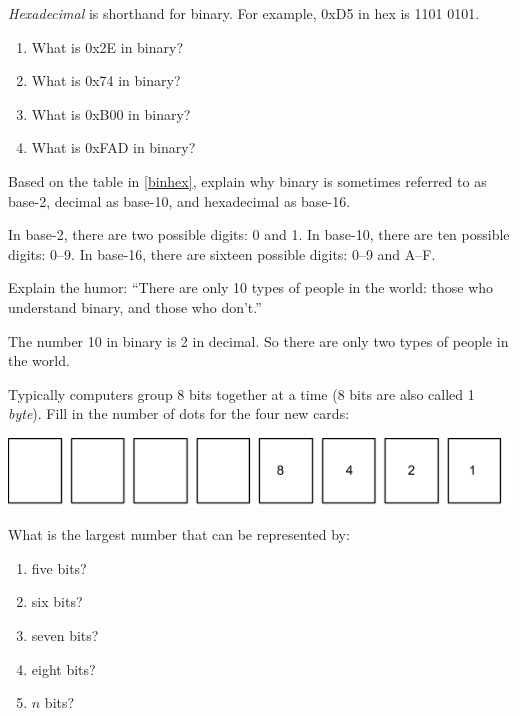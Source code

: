 \Q \emph{Hexadecimal} is shorthand for binary. For example, 0xD5 in hex is 1101 0101.

\begin{enumerate}
\item What is 0x2E in binary? 
\item What is 0x74 in binary? 
\item What is 0xB00 in binary? 
\item What is 0xFAD in binary? 
\end{enumerate}


\Q Based on the table in \ref{binhex}, explain why binary is sometimes referred to as base-2, decimal as base-10, and hexadecimal as base-16.

\begin{answer}
In base-2, there are two possible digits: 0 and 1.
In base-10, there are ten possible digits: 0--9.
In base-16, there are sixteen possible digits: 0--9 and A--F.
\end{answer}


\Q Explain the humor: ``There are only 10 types of people in the world: those who understand binary, and those who don't.''

\begin{answer}
The number 10 in binary is 2 in decimal.
So there are only two types of people in the world.
\end{answer}


\Q Typically computers group 8 bits together at a time (8 bits are also called 1 \emph{byte}).
Fill in the number of dots for the four new cards: 

\begin{center}
\includegraphics[width=\textwidth]{CSP/binary5.png}
\end{center}


\Q What is the largest number that can be represented by:
\begin{enumerate}
\item five bits? 
\item six bits? 
\item seven bits? 
\item eight bits? 
\item $n$ bits? 
\end{enumerate}


